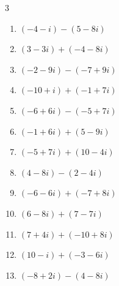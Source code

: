 \begin{multicols}{3}
\begin{enumerate}
\columnbreak %

\resetques

  \item $\displaystyle (-4-i) - (5-8i)$

        \phantom{$\displaystyle =-9+7i$}

  \item $\displaystyle (3-3i) + (-4-8i)$

        \phantom{$\displaystyle =-1-11i$}

  \item $\displaystyle (-2-9i) - (-7+9i)$

        \phantom{$\displaystyle =5-18i$}

  \item $\displaystyle (-10+i) + (-1+7i)$

        \phantom{$\displaystyle =-11+8i$}

  \item $\displaystyle (-6+6i) - (-5+7i)$

        \phantom{$\displaystyle =-1-i$}

  \item $\displaystyle (-1+6i) + (5-9i)$

        \phantom{$\displaystyle =4-3i$}

  \item $\displaystyle (-5+7i) + (10-4i)$

        \phantom{$\displaystyle =5+3i$}

  \item $\displaystyle (4-8i) - (2-4i)$

        \phantom{$\displaystyle =2-4i$}

  \item $\displaystyle (-6-6i) + (-7+8i)$

        \phantom{$\displaystyle =-13+2i$}

  \item $\displaystyle (6-8i) + (7-7i)$

        \phantom{$\displaystyle =13-15i$}

  \item $\displaystyle (7+4i) + (-10+8i)$

        \phantom{$\displaystyle =-3+12i$}

  \item $\displaystyle (10-i) + (-3-6i)$

        \phantom{$\displaystyle =7-7i$}

  \item $\displaystyle (-8+2i) - (4-8i)$


\end{enumerate}
\end{multicols}
